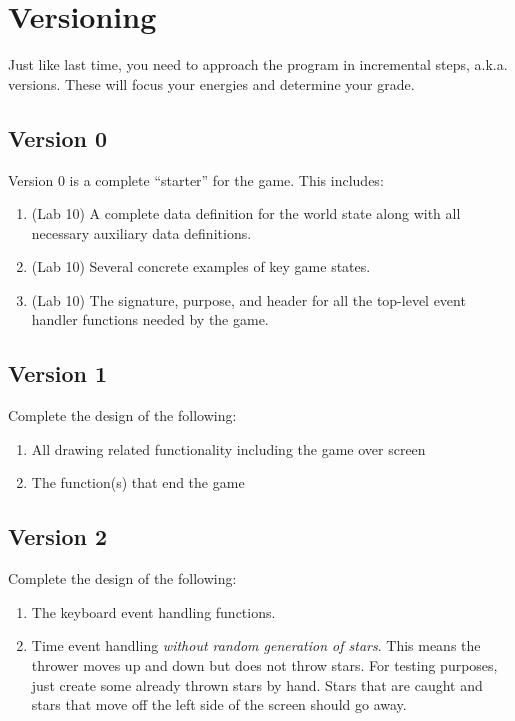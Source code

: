 \documentclass[nobib]{tufte-handout}
\begin{document}
\section{Versioning}

Just like last time, you need to approach the program in incremental steps, a.k.a. versions. These will focus your energies and determine your grade.

\subsection{Version 0}

Version 0 is a complete ``starter'' for the game. This includes:
\begin{enumerate}
  \item (Lab 10) A complete data definition for the world state along with all necessary auxiliary data definitions.
  \item (Lab 10) Several concrete examples of key game states.
  \item (Lab 10) The signature, purpose, and header for all the top-level event handler functions needed by the game.
\end{enumerate}

\subsection{Version 1}

Complete the design of the following:
\begin{enumerate}
  \item All drawing related functionality including the game over screen
  \item The function(s) that end the game
\end{enumerate}

\subsection{Version 2}

Complete the design of the following:
\begin{enumerate}
  \item The keyboard event handling functions.
  \item Time event handling \textit{without random generation of stars}. This means the thrower moves up and down but does not throw stars.  For testing purposes, just create some already thrown stars by hand.  Stars that are caught and stars that move off the left side of the screen should go away.
\end{enumerate}
\end{document}
